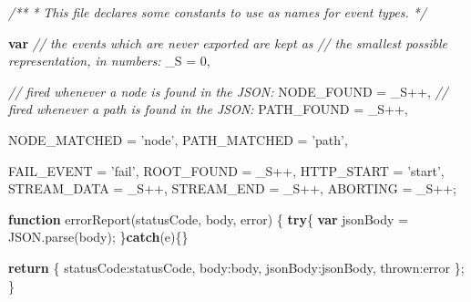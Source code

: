 \documentclass[12pt, ]{article}
\newenvironment{Shaded}{}{}
\newcommand{\KeywordTok}[1]{\textcolor[rgb]{0.00,0.44,0.13}{\textbf{{#1}}}}
\newcommand{\DataTypeTok}[1]{\textcolor[rgb]{0.56,0.13,0.00}{{#1}}}
\newcommand{\DecValTok}[1]{\textcolor[rgb]{0.25,0.63,0.44}{{#1}}}
\newcommand{\StringTok}[1]{\textcolor[rgb]{0.25,0.44,0.63}{{#1}}}
\newcommand{\CommentTok}[1]{\textcolor[rgb]{0.38,0.63,0.69}{\textit{{#1}}}}
\newcommand{\OtherTok}[1]{\textcolor[rgb]{0.00,0.44,0.13}{{#1}}}
\newcommand{\FunctionTok}[1]{\textcolor[rgb]{0.02,0.16,0.49}{{#1}}}
\newcommand{\NormalTok}[1]{{#1}}
\begin{document}
\begin{Shaded}
\begin{Highlighting}[]
\CommentTok{/**}
\CommentTok{ * This file declares some constants to use as names for event types.}
\CommentTok{ */}

\KeywordTok{var} \CommentTok{// the events which are never exported are kept as }
    \CommentTok{// the smallest possible representation, in numbers:}
    \NormalTok{_S = }\DecValTok{0}\NormalTok{,}

    \CommentTok{// fired whenever a node is found in the JSON:}
    \NormalTok{NODE_FOUND    = _S++,}
    \CommentTok{// fired whenever a path is found in the JSON:      }
    \NormalTok{PATH_FOUND    = _S++,   }
    
    \NormalTok{NODE_MATCHED  = }\StringTok{'node'}\NormalTok{,}
    \NormalTok{PATH_MATCHED  = }\StringTok{'path'}\NormalTok{,}
         
    \NormalTok{FAIL_EVENT    = }\StringTok{'fail'}\NormalTok{,    }
    \NormalTok{ROOT_FOUND    = _S++,    }
    \NormalTok{HTTP_START    = }\StringTok{'start'}\NormalTok{,}
    \NormalTok{STREAM_DATA   = _S++,}
    \NormalTok{STREAM_END    = _S++,}
    \NormalTok{ABORTING      = _S++;}
    
\KeywordTok{function} \FunctionTok{errorReport}\NormalTok{(statusCode, body, error) \{}
   \KeywordTok{try}\NormalTok{\{}
      \KeywordTok{var} \NormalTok{jsonBody = }\OtherTok{JSON}\NormalTok{.}\FunctionTok{parse}\NormalTok{(body);}
   \NormalTok{\}}\KeywordTok{catch}\NormalTok{(e)\{\}}

   \KeywordTok{return} \NormalTok{\{}
      \DataTypeTok{statusCode}\NormalTok{:statusCode,}
      \DataTypeTok{body}\NormalTok{:body,}
      \DataTypeTok{jsonBody}\NormalTok{:jsonBody,}
      \DataTypeTok{thrown}\NormalTok{:error}
   \NormalTok{\};}
\NormalTok{\}    }
\end{Highlighting}
\end{Shaded}

\pagebreak


\label{src_functional}
\end{document}
